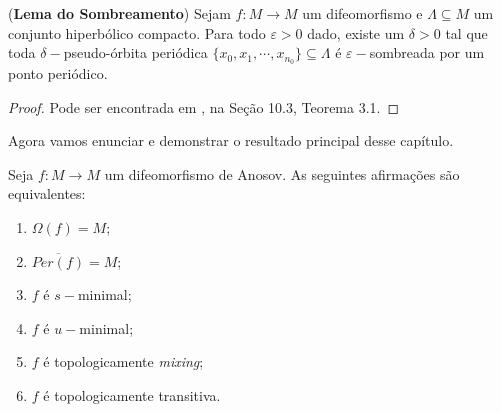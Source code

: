 \begin{lema}\label{lemadosombrea} (\textbf{Lema do Sombreamento}) Sejam $f:M\to M$ um difeomorfismo e $\Lambda\subseteq M$ um conjunto hiperbólico compacto. Para todo $\varepsilon>0$ dado, existe um $\delta>0$ tal que toda $\delta-$pseudo-órbita periódica $\{x_0,x_1,\cdots,x_{n_0}\}\subseteq \Lambda$ é $\varepsilon-$sombreada por um ponto periódico.
\end{lema}

\begin{proof} Pode ser encontrada em \cite{robinson}, na Seção 10.3, Teorema 3.1.
\end{proof}

Agora vamos enunciar e demonstrar o resultado principal desse capítulo.

\begin{teorema}\label{TeoEquivMinimal}
Seja $f : M \to M$ um difeomorfismo de Anosov. As seguintes afirmações são equivalentes:
\begin{enumerate}[\hspace{0.5cm}i)]
\item $\Omega(f)=M$; 
\item $\overline{Per(f)}=M$;
\item $f$ é $s-$minimal;
\item $f$ é $u-$minimal;
\item $f$ é topologicamente \textit{mixing};
\item $f$ é topologicamente transitiva.
\end{enumerate}
\end{teorema}

